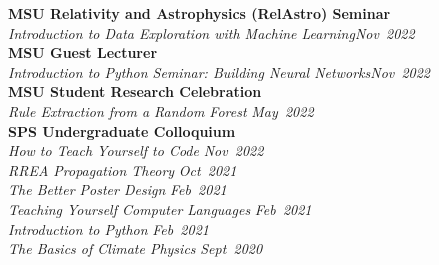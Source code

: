 \documentclass[margin]{res}
\begin{document}
\begin{resume}
\textbf{MSU Relativity and Astrophysics (RelAstro) Seminar}\\
\hspace{3ex} {\sl Introduction to Data Exploration with Machine Learning}\hfill {\sl Nov~2022}\vspace*{1ex}\\
\textbf{MSU Guest Lecturer}\\
\hspace{3ex} {\sl Introduction to Python Seminar: Building Neural Networks}\hfill {\sl Nov~2022}\vspace*{1ex}\\
\textbf{MSU Student Research Celebration}\\
\hspace{3ex} {\sl Rule Extraction from a Random Forest} \hfill {\sl May~2022}\vspace*{1ex}\\
\textbf{SPS Undergraduate Colloquium}\\
\hspace{3ex} {\sl How to Teach Yourself to Code} \hfill {\sl Nov~2022}\\
\hspace{3ex} {\sl RREA Propagation Theory} \hfill {\sl Oct~2021}\\
\hspace{3ex} {\sl The Better Poster Design} \hfill {\sl Feb~2021}\\
\hspace{3ex} {\sl Teaching Yourself Computer Languages} \hfill {\sl Feb~2021}\\
\hspace{3ex} {\sl Introduction to Python} \hfill {\sl Feb~2021}\\
\hspace{3ex} {\sl The Basics of Climate Physics} \hfill {\sl Sept~2020}

	

\end{resume}
\end{document}
